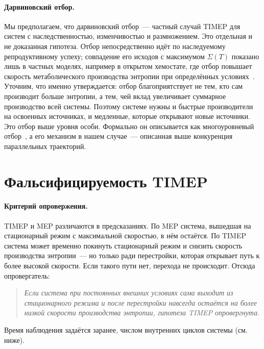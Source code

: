 \documentclass[11pt,a4paper]{article}
\begin{document}
\paragraph{Дарвиновский отбор.}
Мы предполагаем, что дарвиновский отбор~--- частный случай TIMEP для систем с наследственностью, изменчивостью и размножением. Это отдельная и не доказанная гипотеза. Отбор непосредственно идёт по наследуемому репродуктивному успеху; совпадение его исходов с максимумом $\Sigma(T)$ показано лишь в частных моделях, например в открытом хемостате, где отбор повышает скорость метаболического производства энтропии при определённых условиях~\cite{degioia2026}. Уточним, что именно утверждается: отбор благоприятствует не тем, кто сам производит больше энтропии, а тем, чей вклад увеличивает суммарное производство всей системы. Поэтому системе нужны и быстрые производители на освоенных источниках, и медленные, которые открывают новые источники. Это отбор выше уровня особи. Формально он описывается как многоуровневый отбор~\cite{price1970,price1972}, а его механизм в нашем случае~--- описанная выше конкуренция параллельных траекторий.

\section{Фальсифицируемость TIMEP}\label{sec:test}

\paragraph{Критерий опровержения.}
TIMEP и MEP различаются в предсказаниях. По MEP система, вышедшая на стационарный режим с максимальной скоростью, в нём остаётся. По TIMEP система может временно покинуть стационарный режим и снизить скорость производства энтропии~--- но только ради перестройки, которая открывает путь к более высокой скорости. Если такого пути нет, перехода не происходит. Отсюда опровергатель:

\begin{quote}
\emph{Если система при постоянных внешних условиях сама выходит из стационарного режима и после перестройки навсегда остаётся на более низкой скорости производства энтропии, гипотеза TIMEP опровергнута.}
\end{quote}

Время наблюдения задаётся заранее, числом внутренних циклов системы (см. ниже).
\end{document}
